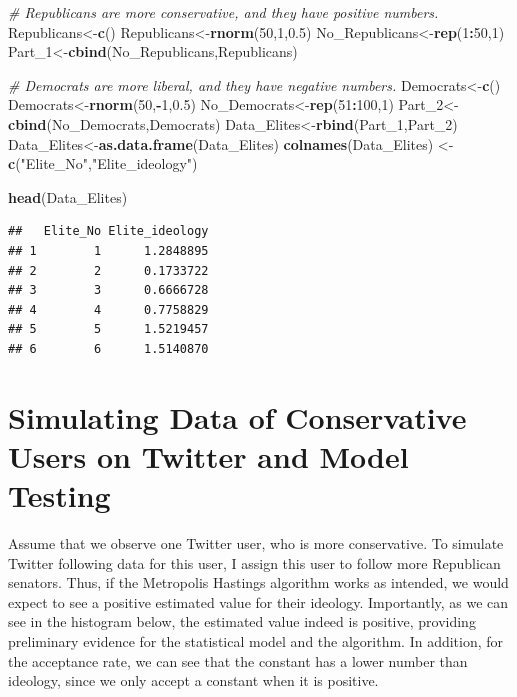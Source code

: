 \documentclass[]{book}
\newenvironment{Shaded}{\begin{snugshade}}{\end{snugshade}}
\newcommand{\KeywordTok}[1]{\textcolor[rgb]{0.13,0.29,0.53}{\textbf{#1}}}
\newcommand{\DecValTok}[1]{\textcolor[rgb]{0.00,0.00,0.81}{#1}}
\newcommand{\FloatTok}[1]{\textcolor[rgb]{0.00,0.00,0.81}{#1}}
\newcommand{\StringTok}[1]{\textcolor[rgb]{0.31,0.60,0.02}{#1}}
\newcommand{\CommentTok}[1]{\textcolor[rgb]{0.56,0.35,0.01}{\textit{#1}}}
\newcommand{\OperatorTok}[1]{\textcolor[rgb]{0.81,0.36,0.00}{\textbf{#1}}}
\newcommand{\NormalTok}[1]{#1}
\begin{document}
\begin{Shaded}
\begin{Highlighting}[]
\CommentTok{# Republicans are more conservative, and they have positive numbers.}
\NormalTok{Republicans<-}\KeywordTok{c}\NormalTok{()}
\NormalTok{Republicans<-}\KeywordTok{rnorm}\NormalTok{(}\DecValTok{50}\NormalTok{,}\DecValTok{1}\NormalTok{,}\FloatTok{0.5}\NormalTok{)}
\NormalTok{No_Republicans<-}\KeywordTok{rep}\NormalTok{(}\DecValTok{1}\OperatorTok{:}\DecValTok{50}\NormalTok{,}\DecValTok{1}\NormalTok{)}
\NormalTok{Part_}\DecValTok{1}\NormalTok{<-}\KeywordTok{cbind}\NormalTok{(No_Republicans,Republicans)}

\CommentTok{# Democrats are more liberal, and they have negative numbers.}
\NormalTok{Democrats<-}\KeywordTok{c}\NormalTok{()}
\NormalTok{Democrats<-}\KeywordTok{rnorm}\NormalTok{(}\DecValTok{50}\NormalTok{,}\OperatorTok{-}\DecValTok{1}\NormalTok{,}\FloatTok{0.5}\NormalTok{)}
\NormalTok{No_Democrats<-}\KeywordTok{rep}\NormalTok{(}\DecValTok{51}\OperatorTok{:}\DecValTok{100}\NormalTok{,}\DecValTok{1}\NormalTok{)}
\NormalTok{Part_}\DecValTok{2}\NormalTok{<-}\KeywordTok{cbind}\NormalTok{(No_Democrats,Democrats)}
\NormalTok{Data_Elites<-}\KeywordTok{rbind}\NormalTok{(Part_}\DecValTok{1}\NormalTok{,Part_}\DecValTok{2}\NormalTok{)}
\NormalTok{Data_Elites<-}\KeywordTok{as.data.frame}\NormalTok{(Data_Elites)}
\KeywordTok{colnames}\NormalTok{(Data_Elites) <-}\StringTok{ }\KeywordTok{c}\NormalTok{(}\StringTok{"Elite_No"}\NormalTok{,}\StringTok{"Elite_ideology"}\NormalTok{)}

\KeywordTok{head}\NormalTok{(Data_Elites)}
\end{Highlighting}
\end{Shaded}

\begin{verbatim}
##   Elite_No Elite_ideology
## 1        1      1.2848895
## 2        2      0.1733722
## 3        3      0.6666728
## 4        4      0.7758829
## 5        5      1.5219457
## 6        6      1.5140870
\end{verbatim}

\section{Simulating Data of Conservative Users on Twitter and Model
Testing}\label{simulating-data-of-conservative-users-on-twitter-and-model-testing}

Assume that we observe one Twitter user, who is more conservative. To
simulate Twitter following data for this user, I assign this user to
follow more Republican senators. Thus, if the Metropolis Hastings
algorithm works as intended, we would expect to see a positive estimated
value for their ideology. Importantly, as we can see in the histogram
below, the estimated value indeed is positive, providing preliminary
evidence for the statistical model and the algorithm. In addition, for
the acceptance rate, we can see that the constant has a lower number
than ideology, since we only accept a constant when it is positive.
\end{document}

